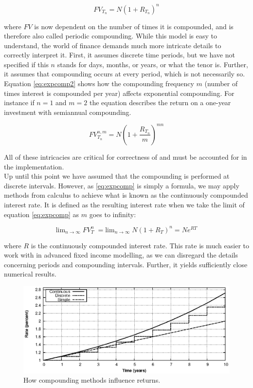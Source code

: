 \begin{equation}\label{eq:expcomp}
FV_{T_n} = N (1 + R_{T_n})^n
\end{equation}

where $FV$ is now dependent on the number of times it is compounded, and is 
therefore also called periodic compounding.
While this model is easy to understand, the world of finance demands much more 
intricate details to correctly interpret it. First, it assumes 
discrete time periods, but we have not specified if this $n$ stands for days, 
months, or years, or what the tenor is. Further, it assumes that compounding
occurs at every period, which is not necessarily so. Equation \ref{eq:expcomp2}
shows how the compounding frequency $m$ (number of times interest is compounded
per year) affects exponential compounding. For instance if $n=1$ and $m=2$ the
equation describes the return on a one-year investment with semiannual compounding.

\begin{equation}\label{eq:expcomp2}
FV_{T_n}^{n,m} = N (1 + \frac{R_{T_n}}{m})^{mn}
\end{equation}

All of these intricacies are critical for correctness of \hql and must
be accounted for in the implementation.\\

Up until this point we have assumed that the compounding is performed at 
discrete intervals. However, as \ref{eq:expcomp} is simply a formula, we may apply 
methods  from calculus to achieve what is known as the continuously compounded interest 
rate. It is defined as the resulting interest rate when we take the limit of 
equation \ref{eq:expcomp} as $m$ goes to infinity:

\begin{equation}
\text{lim}_{n \rightarrow \infty}\; FV_T^n \; = \text{lim}_{n \rightarrow \infty}\; N (1 + R_T)^n
= N e^{RT}
\end{equation}

where $R$ is the continuously compounded interest rate\cite{HULL}. This rate
is much easier to work with in advanced fixed income modelling\cite{cmunk}, 
as we can disregard the details concerning periods and compounding intervals.
Further, it yields sufficiently close numerical results.

\begin{figure}[!htb]
\centering
\includegraphics[scale=1.2]{images/comp02.eps}
\caption{How compounding methods influence returns.}
\label{fig:comp02}
\end{figure}

